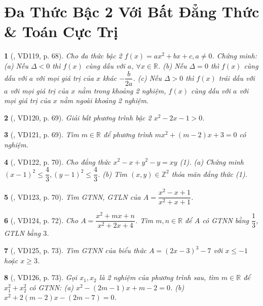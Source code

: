 \documentclass{article}
\newtheorem{baitoan}{}
\begin{document}
\section{Đa Thức Bậc 2 Với Bất Đẳng Thức \& Toán Cực Trị}

\begin{baitoan}[\cite{Binh_Toan_9_tap_2}, VD119, p. 68]
	Cho đa thức bậc 2 $f(x) = ax^2 + bx + c,a\ne0$. Chứng minh: (a) Nếu $\Delta < 0$ thì $f(x)$ cùng dấu với $a$, $\forall x\in\mathbb{R}$. (b) Nếu $\Delta = 0$ thì $f(x)$ cùng dấu với $a$ với mọi giá trị của $x$ khác $-\dfrac{b}{2a}$. (c) Nếu $\Delta > 0$ thì $f(x)$ trái dấu với $a$ với mọi giá trị của $x$ nằm trong khoảng 2 nghiệm, $f(x)$ cùng dấu với $a$ với mọi giá trị của $x$ nằm ngoài khoảng 2 nghiệm.
\end{baitoan}

\begin{baitoan}[\cite{Binh_Toan_9_tap_2}, VD120, p. 69]
	Giải bất phương trình bậc 2 $x^2 - 2x - 1 > 0$.
\end{baitoan}

\begin{baitoan}[\cite{Binh_Toan_9_tap_2}, VD121, p. 69]
	Tìm $m\in\mathbb{R}$ để phương trình $mx^2 + (m - 2)x + 3 = 0$ có nghiệm.
\end{baitoan}

\begin{baitoan}[\cite{Binh_Toan_9_tap_2}, VD122, p. 70]
	Cho đẳng thức $x^2 - x + y^2 - y = xy$ {\rm(1)}. (a) Chứng minh $(x - 1)^2\le\dfrac{4}{3},(y - 1)^2\le\dfrac{4}{3}$. (b) Tìm $(x,y)\in\mathbb{Z}^2$ thỏa mãn đẳng thức {\rm(1)}.
\end{baitoan}

\begin{baitoan}[\cite{Binh_Toan_9_tap_2}, VD123, p. 70]
	Tìm {\rm GTNN, GTLN} của $A = \dfrac{x^2 - x + 1}{x^2 + x + 1}$.
\end{baitoan}

\begin{baitoan}[\cite{Binh_Toan_9_tap_2}, VD124, p. 72]
	Cho $A = \dfrac{x^2 + mx + n}{x^2 + 2x + 4}$. Tìm $m,n\in\mathbb{R}$ để $A$ có {\rm GTNN} bằng $\dfrac{1}{3}$, {\rm GTLN} bằng $3$.
\end{baitoan}

\begin{baitoan}[\cite{Binh_Toan_9_tap_2}, VD125, p. 73]
	Tìm {\rm GTNN} của biểu thức $A = (2x - 3)^3 - 7$ với $x\le-1$ hoặc $x\ge3$.
\end{baitoan}

\begin{baitoan}[\cite{Binh_Toan_9_tap_2}, VD126, p. 73]
	Gọi $x_1,x_2$ là 2 nghiệm của phương trình sau, tìm $m\in\mathbb{R}$ để $x_1^2 + x_2^2$ có {\rm GTNN}: (a) $x^2 - (2m - 1)x + m - 2 = 0$. (b) $x^2 + 2(m - 2)x - (2m - 7) = 0$.
\end{baitoan}
\end{document}
